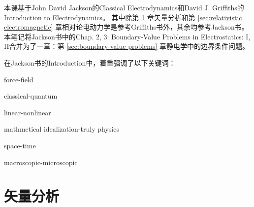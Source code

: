 \def\coursename{电动力学}
\def\courseEnglishname{Electrodynamics}
\def\teachername{唐传祥、邢庆子}
\def\beginday{2023/2/22}
\def\endday{2023/6/16}



\newcommand*{\lapla}{\nabla^2}
\renewcommand*{\r}{\text r}
\renewcommand*{\t}{\text t}
\renewcommand*{\c}{_\text c}
\newcommand*{\emf}{\mathcal{E}}



\firstandforemost
本课基于John David Jackson的Classical Electrodynamics和David J. Griffiths的Introduction to Electrodynamics。
其中除第 \ref{sec:vector analysis} 章矢量分析和第 \ref{sec:relativistic electromagnetic} 章相对论电动力学是参考Griffiths书外，其余均参考Jackson书。本笔记将Jackson书中的Chap. 2, 3: Boundary-Value Problems in Electrostatics: I, II合并为了一章：第 \ref{sec:boundary-value problems} 章静电学中的边界条件问题。

在Jackson书的Introduction中，着重强调了以下关键词：
\begin{compactitem}
	\item force-field
	\item classical-quantum
	\item linear-nonlinear
	\item mathmetical idealization-truly physics
	\item space-time
	\item macroscopic-microscopic
\end{compactitem}

\clearpage
\setcounter{section}{-1}
\section{矢量分析}
\label{sec:vector analysis}
